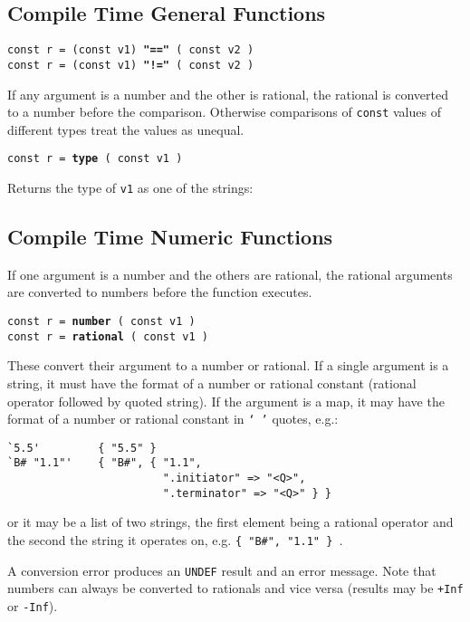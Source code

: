 \documentclass[12pt]{article}
\newcommand{\ttkey}[1]{{\tt \bfseries #1}}
\newenvironment{indpar}[1][0.3in]%
	{\begin{list}{}%
		     {\setlength{\itemsep}{0in}%
		      \setlength{\topsep}{0in}%
		      \setlength{\parsep}{1ex}%
		      \setlength{\labelwidth}{#1}%
		      \setlength{\leftmargin}{#1}%
		      \addtolength{\leftmargin}{\labelsep}}%
	 \item}%
	{\end{list}}
\begin{document}
\subsection{Compile Time General Functions}

{\tt const r = (const v1) \ttkey{"=="} ( const v2 )} \\
{\tt const r = (const v1) \ttkey{"!="} ( const v2 )}
\begin{indpar}
If any argument is a number and the other is rational,
the rational is converted to a number before the comparison.
Otherwise comparisons of {\tt const} values of different types treat
the values as unequal.
\end{indpar}

{\tt const r = \ttkey{type} ( const v1 )}
\begin{indpar}
Returns the type of {\tt v1} as one of the strings: \\
\hspace*{0.5in}{\tt
"special" ~  "number" ~ "rational" ~ "string" ~ \tt "map"}
\end{indpar}


\subsection{Compile Time Numeric Functions}

If one argument is a number and the others are rational,
the rational arguments are converted to numbers before
the function executes.

{\tt const r = \ttkey{number} ( const v1 )} \\
{\tt const r = \ttkey{rational} ( const v1 )}
\begin{indpar}
These convert their argument to a number or rational.  If
a single argument is a string, it must have the format of
a number or rational constant (rational operator followed
by quoted string).
If the argument is a map, it may have the format of
a number or rational constant in {\tt `~'} quotes, e.g.:
\begin{indpar}\begin{verbatim}
`5.5'         { "5.5" }
`B# "1.1"'    { "B#", { "1.1",
                        ".initiator" => "<Q>",
                        ".terminator" => "<Q>" } }
\end{verbatim}\end{indpar}

or it may be a list of two strings, the first element
being a rational operator and the second
the string it operates on, e.g. {\tt \{ "B\#", "1.1" \} }.

A conversion
error produces an {\tt UNDEF} result and an error message.
Note that numbers can always be converted to rationals
and vice versa (results may be {\tt +Inf} or {\tt -Inf}).
\end{indpar}
\end{document}
